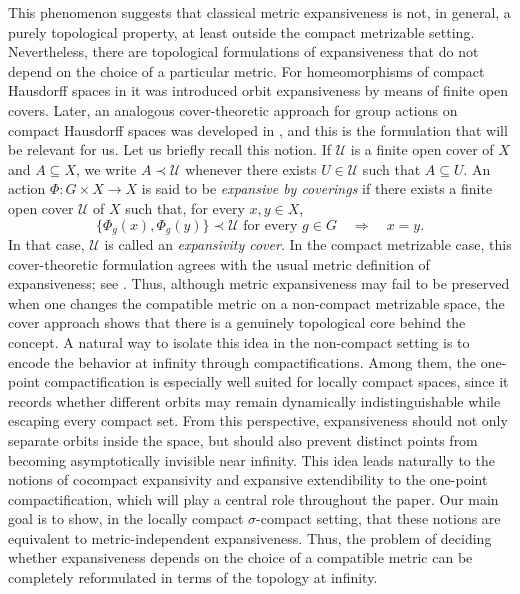 \documentclass[12pt]{amsart}
\theoremstyle{plain}
\theoremstyle{definition}
\theoremstyle{remark}
\begin{document}
This phenomenon suggests that classical metric expansiveness is not, in general, a purely topological property, at least outside the compact metrizable setting. Nevertheless, there are topological formulations of expansiveness that do not depend on the choice of a particular metric.
For homeomorphisms of compact Hausdorff spaces
in \cite{Achigar} it was introduced orbit expansiveness by means of finite open covers.
Later, an analogous cover-theoretic approach for group actions on compact Hausdorff spaces was developed in \cite{Ferrari2025}, and this is the formulation that will be relevant for us.
Let us briefly recall this notion. If $\mathcal U$ is a finite open cover of $X$ and $A\subseteq X$, we write $A\prec\mathcal U$ whenever there exists $U\in\mathcal U$ such that $A\subseteq U$. An action $\Phi\colon G\times X\to X$ is said to be \textit{expansive by coverings} if there exists a finite open cover $\mathcal U$ of $X$ such that, for every $x,y\in X$,
\[
\{\Phi_g(x),\Phi_g(y)\}\prec\mathcal U \text{ for every } g\in G \quad\Longrightarrow\quad x=y.
\]
In that case, $\mathcal U$ is called an \textit{expansivity cover}. In the compact metrizable case, this cover-theoretic formulation agrees with the usual metric definition of expansiveness; see \cite{Achigar,Ferrari2025}. Thus, although metric expansiveness may fail to be preserved when one changes the compatible metric on a non-compact metrizable space, the cover approach shows that there is a genuinely topological core behind the concept.
A natural way to isolate this idea in the non-compact setting is to encode the behavior at infinity through compactifications. Among them, the one-point compactification is especially well suited for locally compact spaces, since it records whether different orbits may remain dynamically indistinguishable while escaping every compact set. From this perspective, expansiveness should not only separate orbits inside the space, but should also prevent distinct points from becoming asymptotically invisible near infinity. This idea leads naturally to the notions of cocompact expansivity and expansive extendibility to the one-point compactification, which will play a central role throughout the paper.
Our main goal is to show, in the locally compact $\sigma$-compact setting, that these notions are equivalent to metric-independent expansiveness.
Thus, the problem of deciding whether expansiveness depends on the choice of a compatible metric can be completely reformulated in terms of the topology at infinity.
\end{document}
